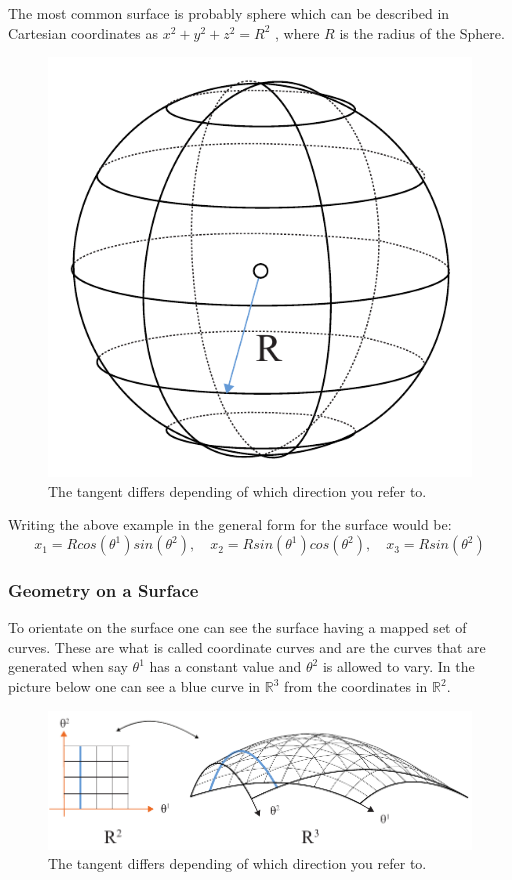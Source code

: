 The most common surface is probably sphere which can be described in Cartesian coordinates as $ x^2 + y^2 + z^2 = R^2$ , where $R$ is the radius of the Sphere.

\begin{figure}[H]
\centering
\includegraphics[width=0.4\linewidth ]{figure/Theory/sphereEx.pdf}                \caption{The tangent differs depending of which direction you refer to. }
\end{figure}






Writing the above example in the general form for the surface would be:
\begin{equation}
x_1 = R cos(\theta^1) sin (\theta^2),\quad
x_2 = R  sin(\theta^1) cos (\theta^2),\quad
x_3 = R sin(\theta^2)
\end{equation}

\subsubsection{Geometry on a Surface}

To orientate on the surface one can see the surface having a mapped set of curves. These are what is called coordinate curves and are the curves that are generated when say $\theta^1$ has a constant value and $\theta^2$ is allowed to vary. In the picture below one can see a blue curve in $\mathbb{R}^3$ from the coordinates in  $\mathbb{R}^2$.

\begin{figure}[H]
\centering
\includegraphics[width=0.9\linewidth ]{figure/Theory/SurfGeo.pdf}                \caption{The tangent differs depending of which direction you refer to. }
\end{figure}

